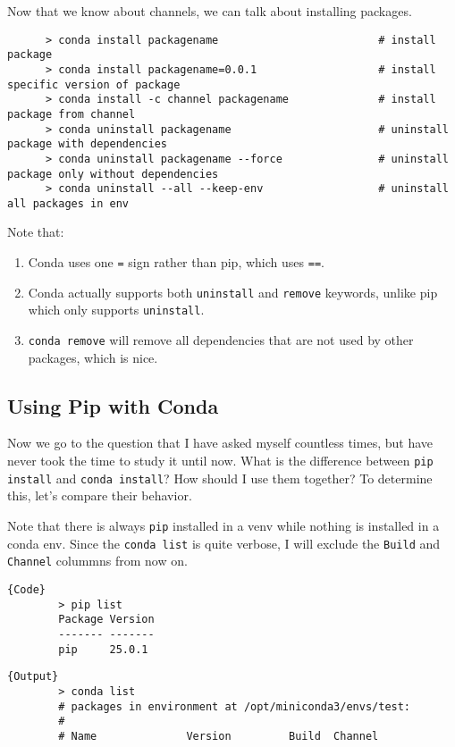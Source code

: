   \begin{example}
    Now that we know about channels, we can talk about installing packages. 
    \begin{lstlisting}
      > conda install packagename                         # install package 
      > conda install packagename=0.0.1                   # install specific version of package
      > conda install -c channel packagename              # install package from channel
      > conda uninstall packagename                       # uninstall package with dependencies
      > conda uninstall packagename --force               # uninstall package only without dependencies
      > conda uninstall --all --keep-env                  # uninstall all packages in env
    \end{lstlisting}
    Note that: 
    \begin{enumerate}
      \item Conda uses one \texttt{=} sign rather than pip, which uses \texttt{==}. 
      \item Conda actually supports both \texttt{uninstall} and \texttt{remove} keywords, unlike pip which only supports \texttt{uninstall}. 
      \item \texttt{conda remove} will remove all dependencies that are not used by other packages, which is nice. 
    \end{enumerate}
  \end{example}

\subsection{Using Pip with Conda} 

  Now we go to the question that I have asked myself countless times, but have never took the time to study it until now. What is the difference between \texttt{pip install} and \texttt{conda install}? How should I use them together? To determine this, let's compare their behavior.  

  \begin{example}
    Note that there is always \texttt{pip} installed in a venv while nothing is installed in a conda env. Since the \texttt{conda list} is quite verbose, I will exclude the \texttt{Build} and \texttt{Channel} colummns from now on. 

    \noindent\begin{minipage}{.25\textwidth}
      \begin{lstlisting}[]{Code}
        > pip list
        Package Version
        ------- -------
        pip     25.0.1 
      \end{lstlisting}
      \end{minipage}
      \hfill
      \begin{minipage}{.74\textwidth}
      \begin{lstlisting}[]{Output}
        > conda list
        # packages in environment at /opt/miniconda3/envs/test:
        #
        # Name              Version         Build  Channel 
      \end{lstlisting}
    \end{minipage}
  \end{example}

